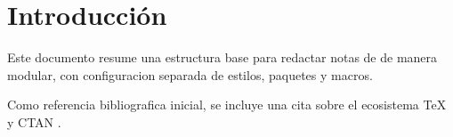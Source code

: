 \documentclass[../main.tex]{subfiles}
\begin{document}
\section{Introducción}
Este documento resume una estructura base para redactar notas de 
de manera modular, con configuracion separada de estilos, paquetes y macros.

Como referencia bibliografica inicial, se incluye una cita sobre el ecosistema TeX y CTAN
\cite{greenwade93}.
\end{document}
